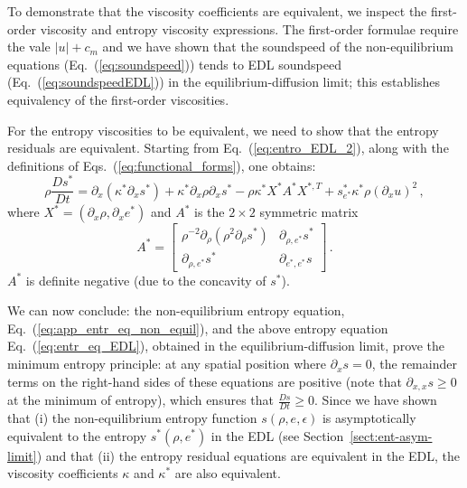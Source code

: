 \documentclass[review]{elsarticle}
\newcommand{\eqt}[1]{Eq.~(\ref{#1})}                     %
\newcommand{\eqts}[1]{Eqs.~(\ref{#1})}                     %
\newcommand{\sect}[1]{Section~\ref{#1}}                     %
\newcommand{\tcr}[1]{\textcolor{red}{#1}}
\newcommand{\matder}[1]{\frac{D #1}{Dt}}
\begin{document}
\begin{appendices}
To demonstrate that the viscosity coefficients are equivalent, we inspect the first-order viscosity and entropy viscosity expressions. The first-order formulae require the vale $|u| + c_m$ and we have shown that the soundspeed of the non-equilibrium equations (\eqt{eq:soundspeed}) tends to  EDL soundspeed (\eqt{eq:soundspeedEDL}) in the equilibrium-diffusion limit; this establishes equivalency of the first-order viscosities.

For the entropy viscosities to be equivalent, we need to show that the entropy residuals are equivalent. Starting from \eqt{eq:entro_EDL_2}, along with the definitions of \eqts{eq:functional_forms}, one obtains:
%
\begin{equation} \label{eq:entro_EDL_3}
\rho \matder {s^*}  
= \partial_x \left( \kappa^* \partial_x s^* \right) 
+
 \kappa^* \partial_x \rho \partial_x s^*
- \rho \kappa^* X^* A^* X^{*,T}
+ s^*_{e^*} \kappa^* \rho \left( \partial_x u \right)^2 
\, ,
\end{equation}
%
 where $X^*=\left( \partial_x \rho, \partial_x e^* \right)$ and $A^*$ is the $2 \times 2$ symmetric matrix
 \begin{equation} \label{eq:entr_eq_EDL}
 A^* = 
 \left[
 \begin{array}{cc}
 \rho^{-2}\partial_{\rho} \left( \rho^2 \partial_{\rho} s^* \right) & \partial_{\rho,e^*} s^* \\
 \partial_{\rho,e^*} s^*                                            & \partial_{e^*,e^*} s    
 \end{array}
 \right] \,.
 \end{equation}
$A^*$ is definite negative (due to the concavity of $s^*$). 
 
We can now conclude: the non-equilibrium entropy equation, \eqt{eq:app_entr_eq_non_equil}, and the above entropy equation \eqt{eq:entr_eq_EDL}, obtained in the equilibrium-diffusion limit, prove the minimum entropy principle: at any spatial position where $\partial_x s =0$, the remainder terms on the right-hand sides of these equations are positive (note that $\partial_{x,x} s \geq0$ at the minimum of entropy), which ensures that $\matder{s} \ge 0$. Since we have shown that (i) the non-equilibrium entropy function $s(\rho,e,\epsilon)$ is asymptotically equivalent to the entropy $s^*(\rho,e^*)$ in the EDL (see \sect{sect:ent-asym-limit}) and that (ii) the entropy residual equations are equivalent in the EDL, the viscosity coefficients $\kappa$ and $\kappa^*$ are also equivalent.


\end{appendices}
\end{document}
